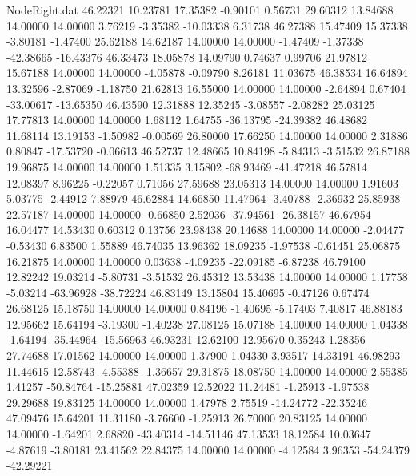 \begin{filecontents}{NodeRight.dat}
  46.22321   10.23781   17.35382    -0.90101    0.56731   29.60312   13.84688   14.00000   14.00000    3.76219   -3.35382  -10.03338    6.31738
  46.27388   15.47409   15.37338    -3.80181   -1.47400   25.62188   14.62187   14.00000   14.00000   -1.47409   -1.37338  -42.38665  -16.43376
  46.33473   18.05878   14.09790     0.74637    0.99706   21.97812   15.67188   14.00000   14.00000   -4.05878   -0.09790    8.26181   11.03675
  46.38534   16.64894   13.32596    -2.87069   -1.18750   21.62813   16.55000   14.00000   14.00000   -2.64894    0.67404  -33.00617  -13.65350
  46.43590   12.31888   12.35245    -3.08557   -2.08282   25.03125   17.77813   14.00000   14.00000    1.68112    1.64755  -36.13795  -24.39382
  46.48682   11.68114   13.19153    -1.50982   -0.00569   26.80000   17.66250   14.00000   14.00000    2.31886    0.80847  -17.53720   -0.06613
  46.52737   12.48665   10.84198    -5.84313   -3.51532   26.87188   19.96875   14.00000   14.00000    1.51335    3.15802  -68.93469  -41.47218
  46.57814   12.08397    8.96225    -0.22057    0.71056   27.59688   23.05313   14.00000   14.00000    1.91603    5.03775   -2.44912    7.88979
  46.62884   14.66850   11.47964    -3.40788   -2.36932   25.85938   22.57187   14.00000   14.00000   -0.66850    2.52036  -37.94561  -26.38157
  46.67954   16.04477   14.53430     0.60312    0.13756   23.98438   20.14688   14.00000   14.00000   -2.04477   -0.53430    6.83500    1.55889
  46.74035   13.96362   18.09235    -1.97538   -0.61451   25.06875   16.21875   14.00000   14.00000    0.03638   -4.09235  -22.09185   -6.87238
  46.79100   12.82242   19.03214    -5.80731   -3.51532   26.45312   13.53438   14.00000   14.00000    1.17758   -5.03214  -63.96928  -38.72224
  46.83149   13.15804   15.40695    -0.47126    0.67474   26.68125   15.18750   14.00000   14.00000    0.84196   -1.40695   -5.17403    7.40817
  46.88183   12.95662   15.64194    -3.19300   -1.40238   27.08125   15.07188   14.00000   14.00000    1.04338   -1.64194  -35.44964  -15.56963
  46.93231   12.62100   12.95670     0.35243    1.28356   27.74688   17.01562   14.00000   14.00000    1.37900    1.04330    3.93517   14.33191
  46.98293   11.44615   12.58743    -4.55388   -1.36657   29.31875   18.08750   14.00000   14.00000    2.55385    1.41257  -50.84764  -15.25881
  47.02359   12.52022   11.24481    -1.25913   -1.97538   29.29688   19.83125   14.00000   14.00000    1.47978    2.75519  -14.24772  -22.35246
  47.09476   15.64201   11.31180    -3.76600   -1.25913   26.70000   20.83125   14.00000   14.00000   -1.64201    2.68820  -43.40314  -14.51146
  47.13533   18.12584   10.03647    -4.87619   -3.80181   23.41562   22.84375   14.00000   14.00000   -4.12584    3.96353  -54.24379  -42.29221

\end{filecontents}
